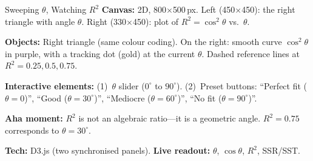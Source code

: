 \documentclass[11pt,a4paper]{article}
\theoremstyle{plain}
\theoremstyle{definition}
\begin{document}
\begin{vizspec}{Sweeping $\theta$, Watching $R^2$}
\textbf{Canvas:} 2D, 800$\times$500\,px.
Left (450$\times$450): the right triangle with angle $\theta$.
Right (330$\times$450): plot of $R^2 = \cos^2\theta$ vs.\ $\theta$.

\textbf{Objects:} Right triangle (same colour coding).
On the right: smooth curve $\cos^2\theta$ in
\textcolor{constraint}{purple}, with a tracking dot
(\textcolor{response}{gold}) at the current $\theta$.
Dashed reference lines at $R^2 = 0.25, 0.5, 0.75$.

\textbf{Interactive elements:}
(1)~$\theta$ slider ($0^\circ$ to $90^\circ$).
(2)~Preset buttons: ``Perfect fit ($\theta=0$)'',
``Good ($\theta=30^\circ$)'', ``Mediocre ($\theta=60^\circ$)'',
``No fit ($\theta=90^\circ$)''.

\textbf{Aha moment:} $R^2$ is not an algebraic ratio---it is a
geometric angle.  $R^2 = 0.75$ corresponds to $\theta = 30^\circ$.

\textbf{Tech:} D3.js (two synchronised panels).
\quad \textbf{Live readout:} $\theta$, $\cos\theta$, $R^2$, SSR/SST.
\end{vizspec}
\end{document}
